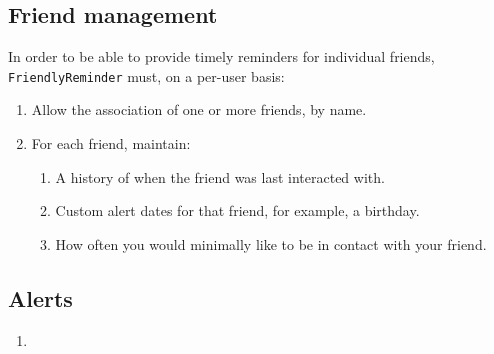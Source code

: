 \documentclass[11pt]{article}
\newcommand{\projname}{{\tt FriendlyReminder}}
\begin{document}
\subsection{Friend management}
In order to be able to provide timely reminders for individual friends, \projname{} must, on a per-user basis:
\begin{enumerate}
	\item Allow the association of one or more friends, by name.
	\item For each friend, maintain:
	\begin{enumerate}
		\item A history of when the friend was last interacted with.
		\item Custom alert dates for that friend, for example, a birthday.
		\item How often you would minimally like to be in contact with your friend.
	\end{enumerate}
\end{enumerate}

\subsection{Alerts}

\begin{enumerate}
\item 
\end{enumerate}
\end{document}

